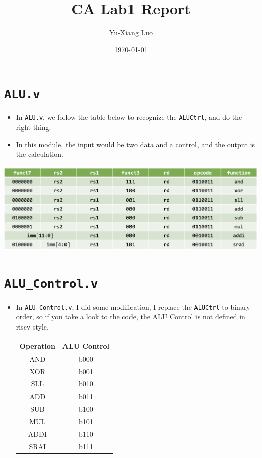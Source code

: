 \documentclass[12pt]{article}
\title{CA Lab1 Report}
\author{Yu-Xiang Luo}
\date{\today} %
\begin{document}
\maketitle %

\section*{\texttt{ALU.v}}
\begin{itemize}
	\item In \texttt{ALU.v}, we follow the table below to recognize the \texttt{ALUCtrl}, and do the right thing.
	\item In this module, the input would be two data and a control, and the output is the calculation.
\end{itemize}

{
	\centering
	\includegraphics[width=\textwidth]{./img/ALU_table.png}
}

\newpage
\section*{\texttt{ALU\_Control.v}}
\begin{itemize}
	\item In \texttt{ALU\_Control.v}, I did some modification, I replace the \texttt{ALUCtrl} to binary order, so if you take a look to the code, the ALU Control is not defined in riscv-style.
		\begin{table}[h!]
			\centering
			\begin{tabular}{|c|c|}
				\hline
				Operation & ALU Control \\ \hline
				AND  & b000  \\ \hline
				XOR  & b001  \\ \hline
				SLL  & b010  \\ \hline
				ADD  & b011  \\ \hline
				SUB  & b100  \\ \hline
				MUL  & b101  \\ \hline
				ADDI & b110 \\ \hline
				SRAI & b111 \\ \hline
			\end{tabular}
		\end{table}
\end{itemize}
\end{document}
